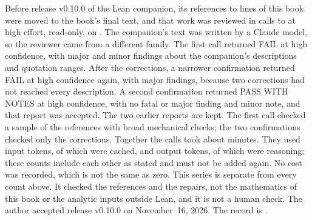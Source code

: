 Before release v0.10.0 of the Lean companion, its references to lines of
this book were moved to the book's final text, and that work was reviewed in
\aiLeanReCalls{} calls to \aiLeanReModel{} at high effort, read-only, on
\aiLeanReDay{}. The companion's text was written by a Claude model, so the
reviewer came from a different family. The first call returned FAIL at high
confidence, with \aiLeanReFirstMajor{} major and \aiLeanReFirstMinor{} minor
findings about the companion's descriptions and quotation ranges. After the
corrections, a narrower confirmation returned FAIL at high confidence again,
with \aiLeanReSecondMajor{} major findings, because two corrections had not
reached every description. A second confirmation returned PASS WITH NOTES at
high confidence, with no fatal or major finding and \aiLeanReThirdMinor{}
minor note, and that report was accepted. The two earlier reports are kept.
The first call checked a sample of the references with broad mechanical checks;
the two confirmations checked only the corrections. Together the calls took
about \aiLeanReMinutes{} minutes. They used \aiLeanReInput{} input tokens, of
which \aiLeanReCached{} were cached, and \aiLeanReOutput{} output tokens, of
which \aiLeanReReasoning{} were reasoning; these counts include each other as
stated and must not be added again. No cost was recorded, which is not the same
as zero. This series is separate from every count above. It checked the
references and the repairs, not the mathematics of this book or the analytic
inputs outside Lean, and it is not a human check. The author accepted release
v0.10.0 on November~16, 2026. The record is
.

